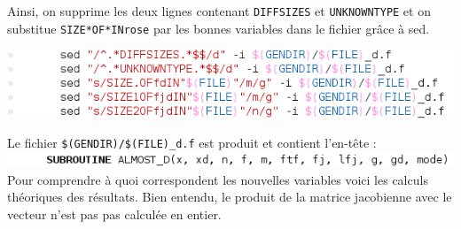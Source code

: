 Ainsi, on supprime les deux lignes contenant \verb!DIFFSIZES! et \verb!UNKNOWNTYPE!
 et on substitue \verb!SIZE*OF*INrose! par les bonnes variables dans le fichier
 grâce à sed.

\includegraphics[scale=0.7]{code/tangenttrans.png}


Le fichier \verb!$(GENDIR)/$(FILE)_d.f! est produit et contient l'en-tête : \\
\includegraphics[scale=0.7]{code/tangentent.png}\\

Pour comprendre à quoi correspondent les nouvelles variables voici les calculs 
théoriques des résultats. Bien entendu, le produit de la matrice jacobienne avec le
vecteur n'est pas pas calculée en entier.\\


